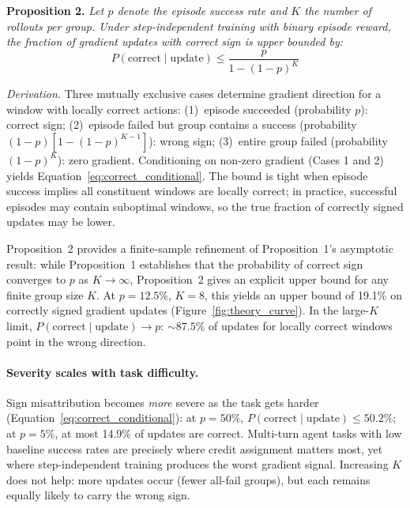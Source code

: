 \textbf{Proposition 2.}\label{prop:correct_sign} \textit{Let $p$ denote the episode success rate and $K$ the number of rollouts per group. Under step-independent training with binary episode reward, the fraction of gradient updates with correct sign is upper bounded by:}
\begin{equation}
P(\text{correct} \mid \text{update}) \leq \frac{p}{1 - (1-p)^{K}}
\label{eq:correct_conditional}
\end{equation}

\textit{Derivation.} Three mutually exclusive cases determine gradient direction for a window with locally correct actions: (1)~episode succeeded (probability $p$): correct sign; (2)~episode failed but group contains a success (probability $(1{-}p)[1{-}(1{-}p)^{K-1}]$): wrong sign; (3)~entire group failed (probability $(1{-}p)^K$): zero gradient. Conditioning on non-zero gradient (Cases 1 and 2) yields Equation~\ref{eq:correct_conditional}. The bound is tight when episode success implies all constituent windows are locally correct; in practice, successful episodes may contain suboptimal windows, so the true fraction of correctly signed updates may be lower.

Proposition~2 provides a finite-sample refinement of Proposition~1's asymptotic result: while Proposition~1 establishes that the probability of correct sign converges to $p$ as $K \to \infty$, Proposition~2 gives an explicit upper bound for any finite group size $K$. At $p{=}12.5\%$, $K{=}8$, this yields an upper bound of 19.1\% on correctly signed gradient updates (Figure~\ref{fig:theory_curve}). In the large-$K$ limit, $P(\text{correct} \mid \text{update}) \to p$: ${\sim}87.5\%$ of updates for locally correct windows point in the wrong direction.

\paragraph{Severity scales with task difficulty.} Sign misattribution becomes \textit{more} severe as the task gets harder (Equation~\ref{eq:correct_conditional}): at $p{=}50\%$, $P(\text{correct} \mid \text{update}) \leq 50.2\%$; at $p{=}5\%$, at most 14.9\% of updates are correct. Multi-turn agent tasks with low baseline success rates are precisely where credit assignment matters most, yet where step-independent training produces the worst gradient signal. Increasing $K$ does not help: more updates occur (fewer all-fail groups), but each remains equally likely to carry the wrong sign.

